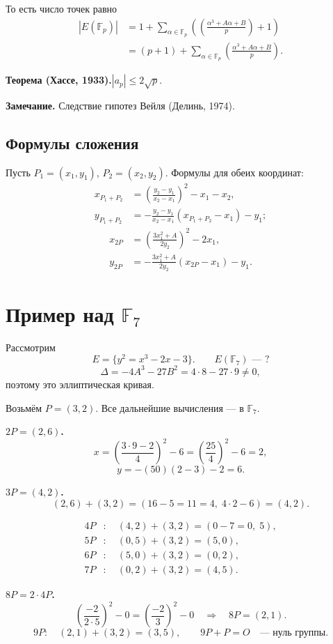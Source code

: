 \documentclass[12pt,a4paper]{article}
\newcommand{\F}{\mathbb F}
\newcommand{\leg}[2]{\left(\frac{#1}{#2}\right)}
\begin{document}
То есть число точек равно
\begin{align*}
|E(\F_p)|
&=1+\sum_{\alpha\in\F_p}\left(\leg{\alpha^3+A\alpha+B}{p}+1\right)\\
&=(p+1)+\sum_{\alpha\in\F_p}\leg{\alpha^3+A\alpha+B}{p}.
\end{align*}

\textbf{Теорема (Хассе, 1933).}\quad $|a_p|\le2\sqrt p$.

\textbf{Замечание.} Следствие гипотез Вейля (Делинь, 1974).

\newpage
\subsection*{Формулы сложения}
Пусть $P_1=(x_1,y_1)$, $P_2=(x_2,y_2)$. Формулы для обеих координат:
\begin{align*}
x_{P_1+P_2}
&=\left(\frac{y_2-y_1}{x_2-x_1}\right)^2-x_1-x_2,\\
y_{P_1+P_2}
&=-\frac{y_2-y_1}{x_2-x_1}(x_{P_1+P_2}-x_1)-y_1;
\end{align*}
\begin{align*}
x_{2P}&=\left(\frac{3x_1^2+A}{2y_2}\right)^2-2x_1,\\
y_{2P}&=-\frac{3x_1^2+A}{2y_2}(x_{2P}-x_1)-y_1.
\end{align*}

\section{Пример над $\F_7$}
Рассмотрим
\[
E=\{y^2=x^3-2x-3\}.\qquad E(\F_7)\text{ --- ?}
\]
\[
\Delta=-4A^3-27B^2=4\cdot8-27\cdot9\ne0,
\]
поэтому это эллиптическая кривая.

Возьмём $P=(3,2)$. Все дальнейшие вычисления --- в $\F_7$.

\textbf{$2P=(2,6)$.}
\[
x=\left(\frac{3\cdot9-2}{4}\right)^2-6
=\left(\frac{25}{4}\right)^2-6=2,
\]
\[
y=-(50)(2-3)-2=6.
\]

\textbf{$3P=(4,2)$.}
\[
(2,6)+(3,2)=(16-5=11=4,\;4\cdot2-6)=(4,2).
\]

\begin{align*}
4P&:\quad (4,2)+(3,2)=(0-7=0,\;5),\\
5P&:\quad (0,5)+(3,2)=(5,0),\\
6P&:\quad (5,0)+(3,2)=(0,2),\\
7P&:\quad (0,2)+(3,2)=(4,5).
\end{align*}

\textbf{$8P=2\cdot4P$.}
\[
\left(\frac{-2}{2\cdot5}\right)^2-0
=\left(\frac{-2}{3}\right)^2-0
\quad\Longrightarrow\quad 8P=(2,1).
\]
\[
9P:\quad (2,1)+(3,2)=(3,5),
\qquad 9P+P=O\quad\text{--- нуль группы}.
\]
\end{document}
